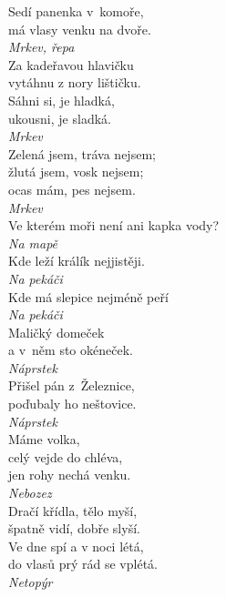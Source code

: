 \begin{multicols}{3}
\noindent
Sedí panenka v~komoře,\\
má vlasy venku na dvoře.\\[1 mm]
{\sl Mrkev, řepa}\\

\noindent
Za kadeřavou hlavičku\\
vytáhnu z nory lištičku.\\
Sáhni si, je hladká,\\
ukousni, je sladká.\\[1 mm]
{\sl Mrkev}\\

\noindent
Zelená jsem, tráva nejsem;\\
žlutá jsem, vosk nejsem;\\
ocas mám, pes nejsem.\\[1 mm]
{\sl Mrkev}\\

\noindent
Ve kterém moři není ani kapka vody?\\[1 mm]
{\sl Na mapě}\\

\noindent
Kde leží králík nejjistěji.\\[1 mm]
{\sl Na pekáči}\\

\noindent
Kde má slepice nejméně peří\\[1 mm]
{\sl Na pekáči}\\

\noindent
Maličký domeček\\
a v~něm sto okéneček.\\[1 mm]
{\sl Náprstek}\\

\noindent
Přišel pán z~Železnice,\\
poďubaly ho neštovice.\\[1 mm]
{\sl Náprstek}\\

\noindent
Máme volka,\\
celý vejde do chléva,\\
jen rohy nechá venku.\\[1 mm]
{\sl Nebozez}\\

\noindent
Dračí křídla, tělo myší,\\
špatně vidí, dobře slyší.\\
Ve dne spí a v noci létá,\\
do vlasů prý rád se vplétá.\\[1 mm]
{\sl Netopýr}\\


\end{multicols}
